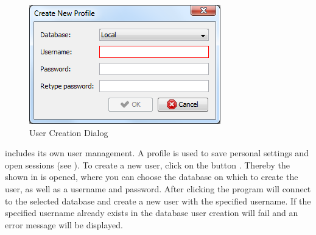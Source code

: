 \begin{figure}[h]
   \centering
   \includegraphics[scale=0.8]{images/sh_user_dialog.png}
   \caption{User Creation Dialog}
   \label{fig:user_dialog}
\end{figure}

\sh includes its own user management.
A profile is used to save personal settings and open sessions (see ).
To create a new user, click on the button .
Thereby the  shown in  is opened, where you can choose the database on which to create the user, as well as a username and password.
After clicking  the program will connect to the selected database and
create a new user with the specified username. If the specified username already
exists in the database user creation will fail and an error message will be
displayed.
